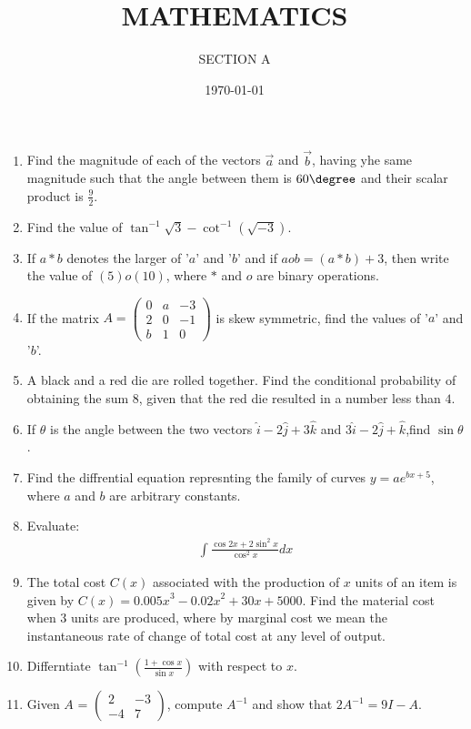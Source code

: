 \documentclass[10pt,-letter paper]{article}
\title{MATHEMATICS}
\author{SECTION A}
\date{\today}
\providecommand{\brak}[1]{\ensuremath{\left(#1\right)}}
\newcommand{\myvec}[1]{\ensuremath{\begin{pmatrix}#1\end{pmatrix}}}
\begin{document}
\maketitle

\begin{enumerate}

\item Find the magnitude of each of the vectors $\overrightarrow{a}$ and $\overrightarrow{b}$, having yhe same magnitude such that the angle between them is ${60\degree}$ and their scalar product is $\frac{9}{2}$.
\item Find the value of $\tan^{-1}\sqrt{3}-\cot^{-1}\brak{\sqrt{-3}}$.

\item  If $a*b$ denotes the larger of '$a$' and '$b$' and if $a o b = \brak{a * b} + 3$, then write the value of $\brak{5} o \brak{10}$, where $*$ and $o$ are binary operations.
\item  If the matrix $A = \myvec{ 0 & a & -3 \\ 2 & 0 & -1 \\ b & 1 & 0 }$ is skew symmetric, find the values of '$a$' and '$b$'.
\item A black and a red die are rolled together. Find the conditional probability of obtaining the sum $8$, given that the red die resulted in a number less than $4$.
\item If $\theta$ is the angle between the two vectors $\hat{i}-2\hat{j}+3\hat{k}$ and $3\hat{i}-2\hat{j}+\hat{k}$,find $\sin\theta$.
\item Find the diffrential equation represnting the family of curves $y=ae^{bx+5}$, where $a$ and $b$ are arbitrary constants.

\item Evaluate:
\begin{align*}
\int\frac{\cos 2x+2\sin^{2}x}{\cos^{2}x}dx
\end{align*}

\item The total cost $C\brak{x}$ associated with the production of $x$ units of an item is given by $C\brak{x} = {0.005x}^3-{0.02x}^2+30x+5000$. Find the material cost when $3$ units are produced, where by marginal cost we mean the instantaneous rate of change of total cost at any level of output.

\item Differntiate  $\tan^{-1}\brak{\frac{1+\cos x}{\sin x}}$ with respect to $x$.
	

\item Given $A$ = $\myvec{ 2 & -3 \\ -4 & 7 }$, compute $A^{-1}$ and show that $2A^{-1} = 9I-A$.


\end{enumerate}
\end{document}

